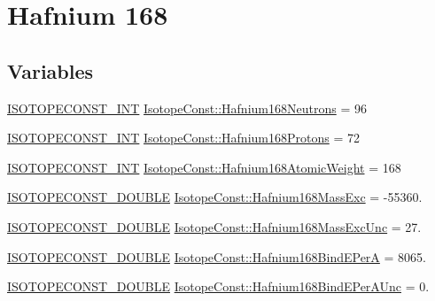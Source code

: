 \hypertarget{group___isotope_const-_hafnium-_hf168}{}\section{Hafnium 168}
\label{group___isotope_const-_hafnium-_hf168}
\subsection*{Variables}
\begin{DoxyCompactItemize}
\item 
\mbox{\hyperlink{group___isotope_const-_macros_ga5f18360b3e99483a35c32d789e62621c}{I\+S\+O\+T\+O\+P\+E\+C\+O\+N\+S\+T\+\_\+\+I\+NT}} \mbox{\hyperlink{group___isotope_const-_hafnium-_hf168_ga06313501d1731368df2c58fc7785b8b4}{Isotope\+Const\+::\+Hafnium168\+Neutrons}} = 96
\item 
\mbox{\hyperlink{group___isotope_const-_macros_ga5f18360b3e99483a35c32d789e62621c}{I\+S\+O\+T\+O\+P\+E\+C\+O\+N\+S\+T\+\_\+\+I\+NT}} \mbox{\hyperlink{group___isotope_const-_hafnium-_hf168_ga3699cc4fcacce018fa1f925ca6da3abe}{Isotope\+Const\+::\+Hafnium168\+Protons}} = 72
\item 
\mbox{\hyperlink{group___isotope_const-_macros_ga5f18360b3e99483a35c32d789e62621c}{I\+S\+O\+T\+O\+P\+E\+C\+O\+N\+S\+T\+\_\+\+I\+NT}} \mbox{\hyperlink{group___isotope_const-_hafnium-_hf168_ga3f403405a89510a4f251a5ccedfcdcb6}{Isotope\+Const\+::\+Hafnium168\+Atomic\+Weight}} = 168
\item 
\mbox{\hyperlink{group___isotope_const-_macros_ga8f45a7272ce02c0b4c65c44636ed719a}{I\+S\+O\+T\+O\+P\+E\+C\+O\+N\+S\+T\+\_\+\+D\+O\+U\+B\+LE}} \mbox{\hyperlink{group___isotope_const-_hafnium-_hf168_ga23c3332d4843243c8721a6df3685ef3b}{Isotope\+Const\+::\+Hafnium168\+Mass\+Exc}} = -\/55360.
\item 
\mbox{\hyperlink{group___isotope_const-_macros_ga8f45a7272ce02c0b4c65c44636ed719a}{I\+S\+O\+T\+O\+P\+E\+C\+O\+N\+S\+T\+\_\+\+D\+O\+U\+B\+LE}} \mbox{\hyperlink{group___isotope_const-_hafnium-_hf168_gaeac77d4efcf246d5d16d2839edf24bdf}{Isotope\+Const\+::\+Hafnium168\+Mass\+Exc\+Unc}} = 27.
\item 
\mbox{\hyperlink{group___isotope_const-_macros_ga8f45a7272ce02c0b4c65c44636ed719a}{I\+S\+O\+T\+O\+P\+E\+C\+O\+N\+S\+T\+\_\+\+D\+O\+U\+B\+LE}} \mbox{\hyperlink{group___isotope_const-_hafnium-_hf168_ga2b76d4335e535df2e19efabbe16c59a9}{Isotope\+Const\+::\+Hafnium168\+Bind\+E\+PerA}} = 8065.
\item 
\mbox{\hyperlink{group___isotope_const-_macros_ga8f45a7272ce02c0b4c65c44636ed719a}{I\+S\+O\+T\+O\+P\+E\+C\+O\+N\+S\+T\+\_\+\+D\+O\+U\+B\+LE}} \mbox{\hyperlink{group___isotope_const-_hafnium-_hf168_ga42fd21d7b0a061cf05d0e2aee942b213}{Isotope\+Const\+::\+Hafnium168\+Bind\+E\+Per\+A\+Unc}} = 0.

\end{DoxyCompactItemize}
